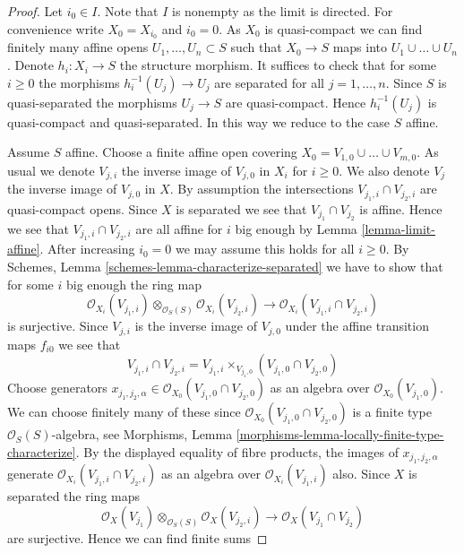 \begin{proof}
Let $i_0 \in I$. Note that $I$ is nonempty as the limit is directed.
For convenience write $X_0 = X_{i_0}$ and $i_0 = 0$.
As $X_0$ is quasi-compact we can find finitely many
affine opens $U_1, \ldots, U_n \subset S$ such that
$X_0 \to S$ maps into $U_1 \cup \ldots \cup U_n$.
Denote $h_i : X_i \to S$ the structure morphism.
It suffices to check that for some $i \geq 0$ the morphisms
$h_i^{-1}(U_j) \to U_j$ are separated for all $j = 1, \ldots,  n$.
Since $S$ is quasi-separated the morphisms $U_j \to S$ are quasi-compact.
Hence $h_i^{-1}(U_j)$ is quasi-compact and quasi-separated.
In this way we reduce to the case $S$ affine.

\medskip\noindent
Assume $S$ affine. Choose a finite affine open covering
$X_0 = V_{1, 0} \cup \ldots \cup V_{m, 0}$. As usual we denote
$V_{j, i}$ the inverse image of $V_{j, 0}$ in $X_i$ for
$i \geq 0$. We also denote $V_j$ the inverse image of
$V_{j, 0}$ in $X$. By assumption the intersections
$V_{j_1, i} \cap V_{j_2, i}$ are quasi-compact opens.
Since $X$ is separated we see that $V_{j_1} \cap V_{j_2}$
is affine. Hence we see that $V_{j_1, i} \cap V_{j_2, i}$
are all affine for $i$ big enough by Lemma \ref{lemma-limit-affine}.
After increasing $i_0 = 0$ we may assume this holds for
all $i \geq 0$.
By Schemes, Lemma \ref{schemes-lemma-characterize-separated}
we have to show that for some
$i$ big enough the ring map
$$
\mathcal{O}_{X_i}(V_{j_1, i})
\otimes_{\mathcal{O}_S(S)}
\mathcal{O}_{X_i}(V_{j_2, i})
\longrightarrow
\mathcal{O}_{X_i}(V_{j_1, i} \cap V_{j_2, i})
$$
is surjective. Since $V_{j, i}$ is the inverse image of
$V_{j, 0}$ under the affine transition maps $f_{i0}$ we
see that
$$
V_{j_1, i} \cap V_{j_2, i} =
V_{j_1, i} \times_{V_{j_1, 0}} (V_{j_1, 0} \cap V_{j_2, 0})
$$
Choose generators
$x_{j_1, j_2, \alpha} \in \mathcal{O}_{X_0}(V_{j_1, 0} \cap V_{j_2, 0})$
as an algebra over $\mathcal{O}_{X_0}(V_{j_1, 0})$.
We can choose finitely many of these since
$\mathcal{O}_{X_0}(V_{j_1, 0} \cap V_{j_2, 0})$
is a finite type $\mathcal{O}_S(S)$-algebra, see
Morphisms, Lemma \ref{morphisms-lemma-locally-finite-type-characterize}.
By the displayed equality of fibre products,
the images of $x_{j_1, j_2, \alpha}$ generate
$\mathcal{O}_{X_i}(V_{j_1, i} \cap V_{j_2, i})$ as an algebra over
$\mathcal{O}_{X_i}(V_{j_1, i})$ also.
Since $X$ is separated the ring maps
$$
\mathcal{O}_{X}(V_{j_1})
\otimes_{\mathcal{O}_S(S)}
\mathcal{O}_{X}(V_{j_2, i})
\longrightarrow
\mathcal{O}_{X}(V_{j_1} \cap V_{j_2})
$$
are surjective. Hence we can find finite sums

\end{proof}
